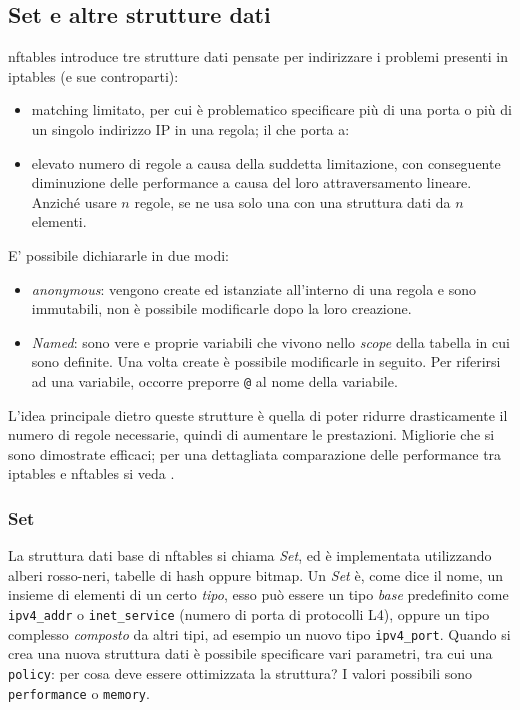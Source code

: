 \subsection{Set e altre strutture dati}
nftables introduce tre strutture dati pensate per indirizzare i problemi
presenti in iptables (e sue controparti):
\begin{itemize}
	\item matching limitato, per cui è problematico specificare più di una porta
	      o più di un singolo indirizzo IP in una regola; il che porta a:
	\item elevato numero di regole a causa della suddetta limitazione, con conseguente
	diminuzione delle performance a causa del loro attraversamento lineare. Anziché usare
	$n$ regole, se ne usa solo una con una struttura dati da $n$ elementi.
\end{itemize}
E' possibile dichiararle in due modi:
\begin{itemize}
	\item \textit{anonymous}: vengono create ed istanziate all'interno di una regola
	      e sono immutabili, non è possibile modificarle dopo la loro creazione.
	\item \textit{Named}: sono vere e proprie variabili che vivono nello \textit{scope}
	      della tabella in cui sono definite. Una volta create è possibile modificarle
	      in seguito. Per riferirsi ad una variabile, occorre preporre \texttt{@} al nome
	      della variabile.
\end{itemize}
L'idea principale dietro queste strutture è quella di poter
ridurre drasticamente il numero di regole necessarie, quindi di aumentare
le prestazioni. Migliorie che si sono
dimostrate efficaci; per una dettagliata comparazione delle performance tra
iptables e nftables si veda \cite{nftables-iptables-thesis}.

\subsubsection{Set}
La struttura dati base di nftables si chiama \textit{Set}, ed è implementata
utilizzando alberi rosso-neri, tabelle di hash oppure bitmap.
Un \textit{Set} è, come dice il nome, un insieme di elementi di un certo \textit{tipo},
esso può essere un tipo \textit{base} predefinito come \texttt{ipv4\_addr} o
\texttt{inet\_service} (numero di porta di protocolli L4), oppure un tipo complesso
\textit{composto} da altri tipi, ad esempio un nuovo tipo \texttt{ipv4\_port}.
Quando si crea una nuova struttura dati è possibile specificare vari parametri,
tra cui una \texttt{policy}: per cosa deve essere ottimizzata la struttura?
I valori possibili sono \texttt{performance} o \texttt{memory}.

